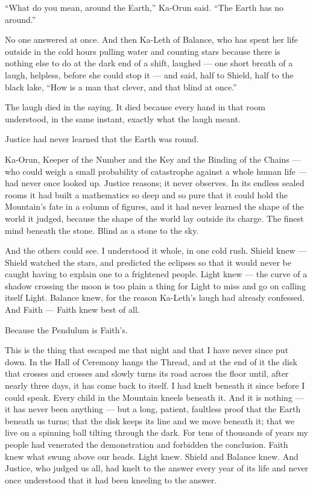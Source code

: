 ``What do you mean, around the Earth,'' Ka-Orun said. ``The Earth has no around.''\par
 
No one answered at once. And then Ka-Leth of Balance, who has spent her life outside in the cold hours pulling water and counting 
stars because there is nothing else to do at the dark end of a shift, laughed --- one short breath of a laugh, helpless, before she 
could stop it --- and said, half to Shield, half to the black lake, ``How is a man that clever, and that blind at once.''\par
 
The laugh died in the saying. It died because every hand in that room understood, in the same instant, exactly what the laugh meant.\par
 
Justice had never learned that the Earth was round.\par
 
Ka-Orun, Keeper of the Number and the Key and the Binding of the Chains --- who could weigh a small probability of catastrophe against a whole human life --- had never once looked up. Justice reasons; it never observes. In its endless sealed rooms it had built a mathematics so deep and so pure that it could hold the Mountain's fate in a column of figures, and it had never learned the shape of the world it judged, because the shape of the world lay outside its charge. The finest mind beneath the stone. Blind as a stone to the sky.\par
 
And the others could see. I understood it whole, in one cold rush. Shield knew --- Shield watched the stars, and predicted the eclipses so that it would never be caught having to explain one to a frightened people. Light knew --- the curve of a shadow crossing the moon is too plain a thing for Light to miss and go on calling itself Light. Balance knew, for the reason Ka-Leth's laugh had already confessed. And Faith --- Faith knew best of all.\par
 
Because the Pendulum is Faith's.\par
 
This is the thing that escaped me that night and that I have never since put down. In the Hall of Ceremony hangs the Thread, and at the end of it the disk that crosses and crosses and slowly turns its road across the floor until, after nearly three days, it has come back to itself. I had knelt beneath it since before I could speak. Every child in the Mountain kneels beneath it. And it is nothing --- it has never been anything --- but a long, patient, faultless proof that the Earth beneath us turns; that the disk keeps its line and we move beneath it; that we live on a spinning ball tilting through the dark. For tens of thousands of years my people had venerated the demonstration and forbidden the conclusion. Faith knew what swung above our heads. Light knew. Shield and Balance knew. And Justice, who judged us all, had knelt to the answer every year of its life and never once understood that it had been kneeling to the answer.\par
 
